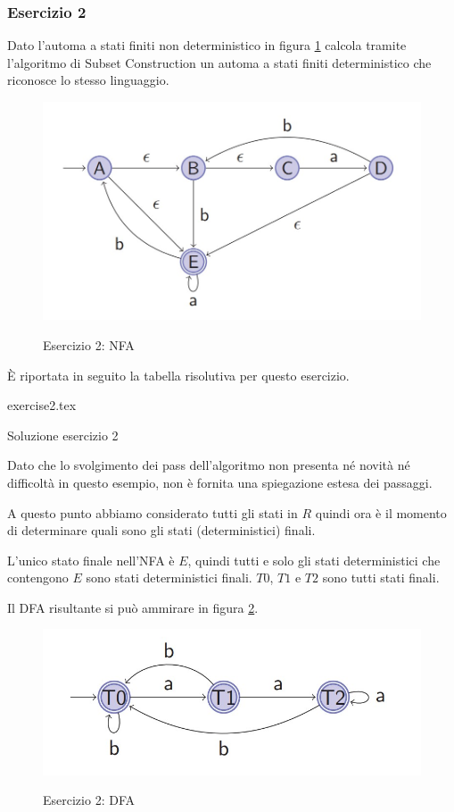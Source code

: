 \documentclass[class=book, crop=false, oneside, 12pt]{standalone}
\begin{document}
\subsubsection*{Esercizio 2}
Dato l'automa a stati finiti non deterministico in figura \ref{es_sc_2} calcola tramite l'algoritmo di Subset Construction un automa a stati finiti deterministico che riconosce lo stesso linguaggio.
\begin{figure}[H]
    \centering
    \includegraphics[width=.8\textwidth,keepaspectratio]{e2_subset_construction.jpg}
    \label{es_sc_2}
    \caption{Esercizio 2: NFA}
\end{figure}
È riportata in seguito la tabella risolutiva per questo esercizio.
\begin{table}[H]
	\centering
	{exercise2.tex}
    \caption{Soluzione esercizio 2}
    \label{Esercizio 2}
\end{table} 
Dato che lo svolgimento dei pass dell'algoritmo non presenta né novità né difficoltà in questo esempio, non è fornita una spiegazione estesa dei passaggi.

A questo punto abbiamo considerato tutti gli stati in \(R\) quindi ora è il momento di determinare quali sono gli stati (deterministici) finali.

L’unico stato finale nell'NFA è \(E\), quindi tutti e solo gli stati deterministici che contengono \(E\) sono stati deterministici finali. \(T0\), \(T1\) e \(T2\) sono tutti stati finali.

Il DFA risultante si può ammirare in figura \ref{sol_sc_2}.
\begin{figure}[H]
    \centering
    \includegraphics[width=.8\textwidth,keepaspectratio]{s2_subset_construction.jpg}
    \label{sol_sc_2}
    \caption{Esercizio 2: DFA}
\end{figure}
\end{document}
